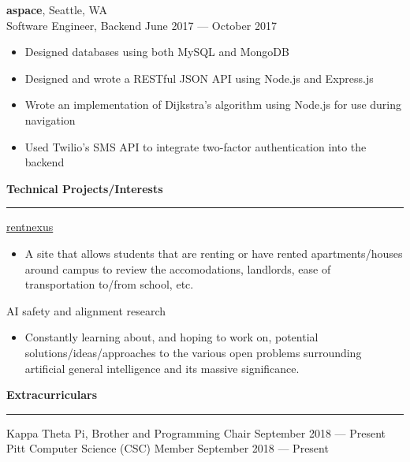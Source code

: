 \documentclass[11pt]{article}
\begin{document}
\begin{flushleft}
		\textbf{aspace}, Seattle, WA\\
		{\small Software Engineer, Backend \hfill June 2017 --- October 2017}
		\begin{itemize}
			\item Designed databases using both MySQL and MongoDB
			\item Designed and wrote a RESTful JSON API using Node.js and Express.js
			\item Wrote an implementation of Dijkstra's algorithm using Node.js for use during navigation
			\item Used Twilio's SMS API to integrate two-factor authentication into the backend
		\end{itemize}
		
		\vspace{1.75mm}
		{\large \raggedright \textbf{Technical Projects/Interests}}
		\vspace{1.5mm}
	
		\hrule
	
		\vspace{2.5mm}
		\href{https://rentnexus.net}{rentnexus}
		\begin{itemize}
			\item A site that allows students that are renting or have rented apartments/houses around campus to review the accomodations, landlords, ease of transportation to/from school, etc.
		\end{itemize}
		AI safety and alignment research
		\begin{itemize}
			\item Constantly learning about, and hoping to work on, potential solutions/ideas/approaches to the various open problems surrounding artificial general intelligence and its massive significance.
		\end{itemize}
		
		\vspace{1.75mm}
		{\large \raggedright \textbf{Extracurriculars}}
		\vspace{1.5mm}
	
		\hrule
	
		\vspace{2.5mm}
		Kappa Theta Pi, Brother and Programming Chair \hfill September 2018 --- Present\\
		Pitt Computer Science (CSC) Member \hfill September 2018 --- Present
	\end{flushleft}
\end{document}
